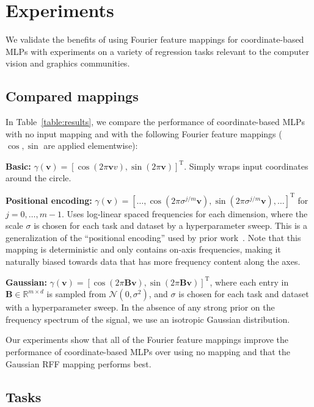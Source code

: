\section{Experiments}
\label{sec:experiments}

We validate the benefits of using Fourier feature mappings for coordinate-based MLPs with experiments on a variety of regression tasks relevant to the computer vision and graphics communities.

\subsection{Compared mappings}

In Table~\ref{table:results}, we compare the performance of coordinate-based MLPs with no input mapping and with the following Fourier feature mappings ($\cos,\sin$ are applied elementwise):

{\bf Basic:} 
$\gamma(\mathbf{v})=\left[\cos(2 \pi \mathbf{v}{v}),\sin(2 \pi \mathbf{v})\right]^\mathrm{T}$. 
Simply wraps input coordinates around the circle.

{\bf Positional encoding:} 
$\gamma(\mathbf{v})=\left[\ldots, \cos(2 \pi \sigma^{j/m} \mathbf{v}),\sin(2 \pi \sigma^{j/m} \mathbf{v}), \ldots\right]^\mathrm{T}$ for $j = 0, \ldots, m-1$. Uses log-linear spaced frequencies for each dimension, where the scale $\sigma$ is chosen for each task and dataset by a hyperparameter sweep. This is a generalization of the ``positional encoding'' used by prior work~\cite{mildenhall2020nerf,vaswani2017attention,Zhong2020Reconstructing}. Note that this mapping is deterministic and only contains on-axis frequencies, making it naturally biased towards data that has more frequency content along the axes.

{\bf Gaussian:}
$\gamma(\mathbf{v})=\left[\cos(2 \pi \mathbf B \mathbf{v}), \sin(2 \pi \mathbf B \mathbf{v})\right]^\mathrm{T}$, 
where each entry in $\mathbf B \in \mathbb R^{m \times d}$ is sampled from $\mathcal N(0,\sigma^2)$, and $\sigma$ is chosen for each task and dataset with a hyperparameter sweep. In the absence of any strong prior on the frequency spectrum of the signal, we use an isotropic Gaussian distribution.

Our experiments show that all of the Fourier feature mappings improve the performance of coordinate-based MLPs over using no mapping and that the Gaussian RFF mapping performs best.

\subsection{Tasks}

